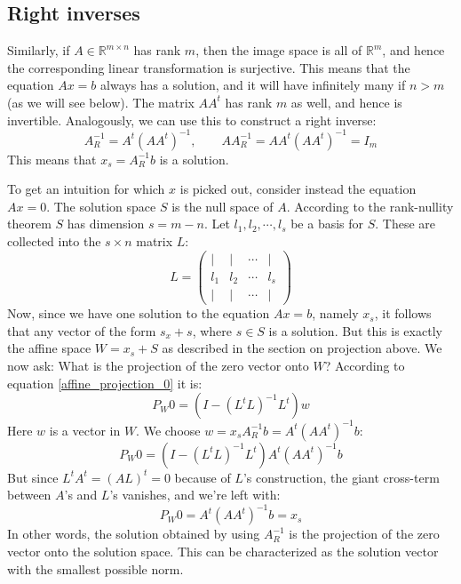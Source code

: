 \documentclass[12pt, a4paper]{article}
\numberwithin{equation}{section}
\begin{document}
\subsection{Right inverses}
Similarly, if $A\in\mathbb{R}^{m\times n}$ has rank $m$, then the image space is all of $\mathbb{R}^m$, and hence the corresponding linear transformation is surjective. This means that the equation $Ax=b$ always has a solution, and it will have infinitely many if $n>m$ (as we will see below). The matrix $AA^t$ has rank $m$ as well, and hence is invertible. Analogously, we can use this to construct a right inverse:
\begin{equation}
A^{-1}_R=A^t(AA^t)^{-1},\qquad AA^{-1}_R=AA^t(AA^t)^{-1}=I_m
\end{equation}
This means that $x_s=A^{-1}_R b$ is a solution.

To get an intuition for which $x$ is picked out, consider instead the equation $Ax=0$. The solution space $S$ is the null space of $A$. According to the rank-nullity theorem $S$ has dimension $s=m-n$. Let $l_1,l_2,\cdots,l_s$ be a basis for $S$. These are collected into the $s\times n$ matrix $L$:
\begin{equation}
L=\begin{pmatrix}
| & | & \cdots & | \\
l_1 & l_2 & \cdots & l_s \\
| & | & \cdots & |
\end{pmatrix}
\end{equation}
Now, since we have one solution to the equation $Ax=b$, namely $x_s$, it follows that any vector of the form $s_x+s$, where $s\in S$ is a solution. But this is exactly the affine space $W=x_s+S$ as described in the section on projection above. We now ask: What is the projection of the zero vector onto $W$? According to equation \ref{affine_projection_0} it is:
\begin{equation}
P_W 0=(I-(L^t L)^{-1}L^t)w
\end{equation}
Here $w$ is a vector in $W$. We choose $w=x_sA^{-1}_R b=A^t(AA^t)^{-1}b$:
\begin{equation}
P_W 0=(I-(L^t L)^{-1}L^t)A^t(AA^t)^{-1}b
\end{equation}
But since $L^t A^t=(AL)^t=0$ because of $L$'s construction, the giant cross-term between $A$'s and $L$'s vanishes, and we're left with:
\begin{equation}
P_W 0=A^t(AA^t)^{-1}b=x_s
\end{equation}
In other words, the solution obtained by using $A^{-1}_R$ is the projection of the zero vector onto the solution space. This can be characterized as the solution vector with the smallest possible norm.
\end{document}
